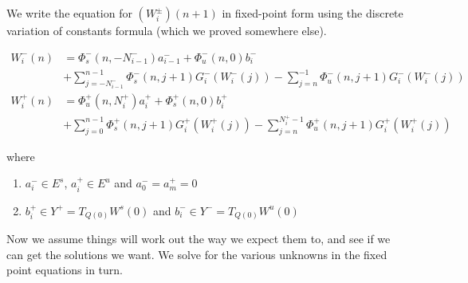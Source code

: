 \documentclass[12pt]{article}
\begin{document}
We write the equation for $(W_i^\pm)(n+1)$ in fixed-point form using the discrete variation of constants formula (which we proved somewhere else).

\begin{align*}
W_i^-(n) &= 
\Phi_s^-(n, -N_{i-1}^-) a_{i-1}^- + \Phi_u^-(n, 0) b_i^-  \\
&+ \sum_{j = -N_{i-1}^-}^{n-1} \Phi_s^-(n, j+1) G_i^-(W_i^-(j)) - \sum_{j = n}^{-1} \Phi_u^-(n, j+1) G_i^-(W_i^-(j)) \\
W_i^+(n) &= \Phi_u^+(n, N_i^+) a_i^+ + \Phi_s^+(n, 0) b_i^+ \\
&+ \sum_{j = 0}^{n-1} \Phi_s^+(n, j+1) G_i^+(W_i^+(j)) 
- \sum_{j = n}^{N_i^+-1} \Phi_u^+(n, j+1) G_i^+(W_i^+(j))
\end{align*}

where 

\begin{enumerate}
\item $a_i^- \in E^s$, $a_i^+ \in E^u$ and $a_0^- = a_m^+ = 0$
\item $b_i^+ \in Y^+ = T_{Q(0)} W^s(0)$ and $b_i^- \in Y^- = T_{Q(0)} W^u(0)$
\end{enumerate}

Now we assume things will work out the way we expect them to, and see if we can get the solutions we want. We solve for the various unknowns in the fixed point equations in turn.
\end{document}
